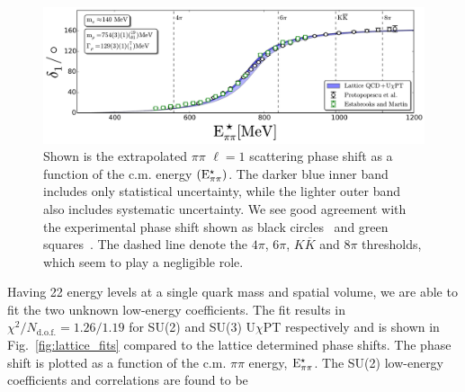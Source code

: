 \documentclass[twocolumn,hyperpdf,
amsmath,amssymb,
aps,prd,10pt,
superscriptaddress,nofootinbib,noeprint,preprintnumbers]{revtex4-1}
\begin{document}
\begin{figure}[t]
\begin{center}
\hspace*{-.7cm}                                                           
\includegraphics[scale=0.59]{figures/global_comparison.pdf}
\caption{Shown is the extrapolated $\pi\pi$ $\ell=1$ scattering phase shift as a function of the c.m. energy $(\rm E^\star_{\pi\pi})$. The darker blue inner band includes only statistical uncertainty, while the lighter outer band also includes systematic uncertainty. We see good agreement with the experimental phase shift shown as black circles~\cite{Protopopescu:1973sh} and green squares~\cite{Estabrooks:1974vu}. The dashed line denote the $4\pi$, $6\pi$, $K\overline{K}$ and $8\pi$ thresholds, which seem to play a negligible role. }\label{fig:global_comparison}
\end{center}
\vspace*{-.6cm}
\end{figure}

 


Having 22 energy levels at a single quark mass and spatial volume, we are able to fit the two unknown low-energy coefficients. The fit results in $\chi^2/ N_\mathrm{d.o.f.} = 1.26/1.19 $ for SU(2) and SU(3) U$\chi$PT respectively and is shown in Fig.~\ref{fig:lattice_fits} compared to the lattice determined phase shifts. The phase shift is plotted as a function of the c.m. $\pi\pi$ energy, $\rm E^\star_{\pi\pi}$. The SU(2) low-energy coefficients and correlations are found to be
\end{document}
